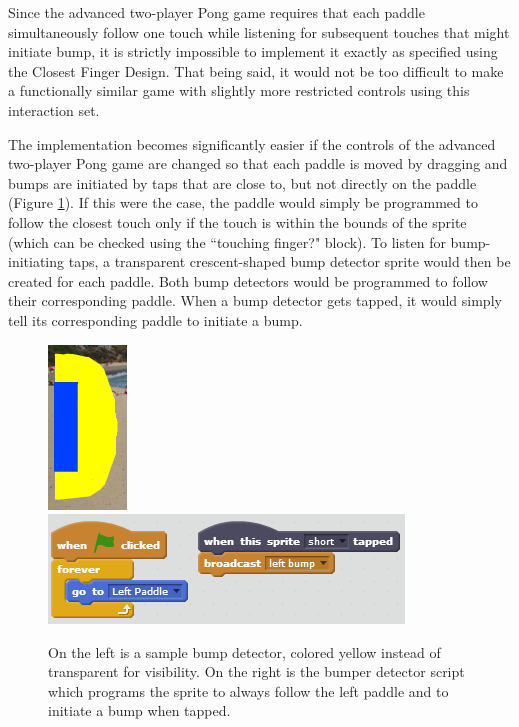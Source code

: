 Since the advanced two-player Pong game requires that each paddle simultaneously follow one touch while listening for subsequent touches that might initiate bump, it is strictly impossible to implement it exactly as specified using the Closest Finger Design. That being said, it would not be too difficult to make a functionally similar game with slightly more restricted controls using this interaction set. 

The implementation becomes significantly easier if the controls of the advanced two-player Pong game are changed so that each paddle is moved by dragging and bumps are initiated by taps that are close to, but not directly on the paddle (Figure \ref{LeftBumperBumperScript}). If this were the case, the paddle would simply be programmed to follow the closest touch only if the touch is within the bounds of the sprite (which can be checked using the ``touching finger?" block). To listen for bump-initiating taps, a transparent crescent-shaped bump detector sprite would then be created for each paddle. Both bump detectors would be programmed to follow their corresponding paddle. When a bump detector gets tapped, it would simply tell its corresponding paddle to initiate a bump.

\begin{figure}
\centering
\includegraphics{images/LeftBumper.PNG}
\includegraphics{images/BumperScript.PNG}
\caption[Sample Bumper Detector And Script For Alternate Advanced Two-Player Pong]{On the left is a sample bump detector, colored yellow instead of transparent for visibility. On the right is the bumper detector script which programs the sprite to always follow the left paddle and to initiate a bump when tapped.}
\label{LeftBumperBumperScript}
\end{figure}

